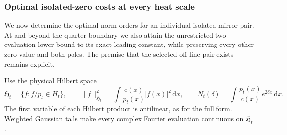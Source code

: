 \documentclass[11pt]{article}
\theoremstyle{remark}\newtheorem{remark}[theorem]{Remark}
\newcommand{\dd}{\,\mathrm d}
\begin{document}
\subsubsection{Optimal isolated-zero costs at every heat scale}
We now determine the optimal norm orders for an individual isolated
mirror pair. At and beyond the quarter boundary we also attain the
unrestricted two-evaluation lower bound to its exact leading constant,
while preserving every other zero value and both poles. The premise
that the selected off-line pair exists remains explicit.

Use the physical Hilbert space
\[
 \mathfrak H_t=\{f:f/p_t\in H_t\},\qquad
 \|f\|_{\mathfrak H_t}^2=\int\frac{c(x)}{p_t(x)}|f(x)|^2\dd x,
 \qquad N_t(\delta)=\int\frac{p_t(x)}{c(x)}e^{2\delta x}\dd x.
                                                               \tag{HOC1}
\]
The first variable of each Hilbert product is antilinear, as for
the full form. Weighted Gaussian tails make every complex Fourier
evaluation continuous on $\mathfrak H_t$.
\end{document}
